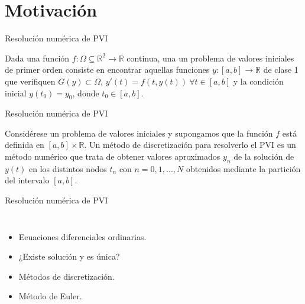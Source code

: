 
\section{Motivación}

{
	
	\begin{frame}{Resolución numérica de PVI}
		\begin{definition} 
			Dada una función $f:\Omega \subseteq \mathbb R^2  \to \mathbb{R}$ continua, una un problema de valores iniciales de primer orden consiste en encontrar aquellas funciones $y: [a,b] \rightarrow \mathbb{R}$ de clase 1 que verifiquen $G(y) \subset \Omega$, $y'(t) = f(t,y(t)) \ \forall t \in [a,b]$ y la condición inicial $y(t_0) = y_0$, donde $t_0 \in [a,b]$.  
		\end{definition}
	\end{frame}
	
	\begin{frame}{Resolución numérica de PVI}
		\begin{definition} 
			Considérese un problema de valores iniciales y supongamos que la función $f$ está definida en $[a,b]\times\mathbb{R}$. Un método de discretización para resolverlo el PVI es un método numérico que trata de obtener valores aproximados $y_n$ de la solución de $y(t)$ en los distintos nodos $t_n$ con $n={0,1,...,N}$ obtenidos mediante la partición del intervalo $[a,b]$.  
		\end{definition}
	\end{frame}
		
		
	\begin{frame}{Resolución numérica de PVI}
		\begin{columns}
			\begin{itemize}
				\item Ecuaciones diferenciales ordinarias.
				\item ¿Existe solución y es única?
				\item Métodos de discretización.
				\item Método de Euler.		
			\end{itemize}
			

\end{columns}
\end{frame}}
